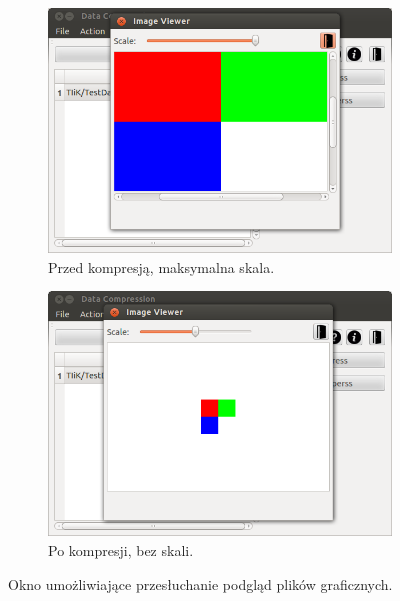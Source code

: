 \documentclass[12pt,a4paper,notitlepage]{report}
\begin{document}
\begin{figure}[H]
\begin{subfigure}{0.45\textwidth}
		\includegraphics[scale=.4]{imageviewer_max}
		\caption{Przed kompresją, maksymalna skala.}
	\end{subfigure}\hfill
	\begin{subfigure}{0.45\textwidth}
		\centering
		\includegraphics[scale=.4]{imageviewer_com}
		\caption{Po kompresji, bez skali.}
	\end{subfigure}
	\caption{Okno umożliwiające przesłuchanie podgląd plików graficznych.}	
\end{figure}
\end{document}
